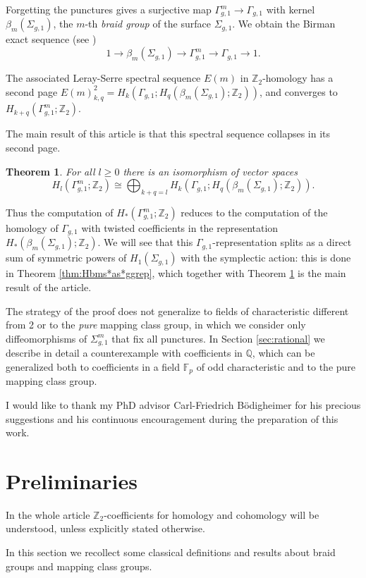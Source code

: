 \documentclass{amsart}
\theoremstyle{plain}
\newtheorem{thm}{Theorem}[section]
\theoremstyle{definition}
\newcommand{\F}{\mathbb{F}}
\newcommand{\Q}{\mathbb{Q}}
\newcommand{\Z}{\mathbb{Z}}
\newcommand{\sgm}{\Sigma_{g,1}^m}
\newcommand{\sg}{\Sigma_{g,1}}
\renewcommand{\gg}{\Gamma_{g,1}}
\newcommand{\ggm}{\gg^m}
\newcommand{\bms}{\beta_{m}(\sg)}
\newcommand{\pa}[1]{\left(#1\right)}
\begin{document}
Forgetting the punctures gives a surjective map $\ggm\to\gg$ with kernel $\bms$,
the $m$-th \emph{braid group} of the surface $\sg$. We obtain the Birman exact sequence (see \cite{Birman:mcgbr})
\begin{equation}
\label{eq:Birman}
1\to\bms\to\ggm\to\gg\to 1.
\end{equation}

The associated Leray-Serre spectral sequence $E(m)$ in $\Z_2$-homology has a second page $E(m)^2_{k,q}=H_k(\gg;H_q(\bms;\Z_2))$,
and converges to $H_{k+q}(\ggm;\Z_2)$.

The main result of this article is that this spectral sequence collapses in its second page.
\begin{thm}
\label{thm:main}
For all $l\geq 0$ there is an isomorphism of vector spaces
\begin{equation}
\label{eq:main}
H_l\pa{\ggm;\Z_2}\cong \bigoplus_{k+q=l} H_k\pa{\gg;H_q\pa{\bms;\Z_2}}.
\end{equation}
\end{thm}
Thus the computation of $H_*\pa{\ggm;\Z_2}$ reduces to the computation of the homology of $\gg$ with
twisted coefficients in the representation $H_*\pa{\bms;\Z_2}$. We will see that this $\gg$-representation
splits as a direct sum of symmetric powers of $H_1(\sg)$ with the symplectic action: this is done in
Theorem \ref{thm:Hbms*as*ggrep}, which together with Theorem \ref{thm:main} is the main result of the article.

The strategy of the proof does not generalize to fields of characteristic different from 2 or to the \emph{pure}
mapping class group, in which we consider only diffeomorphisms of $\sgm$ that fix all punctures. In Section \ref{sec:rational}
we describe in detail a counterexample with coefficients in $\Q$, which can be generalized both to coefficients
in a field $\F_p$ of odd characteristic and to the pure mapping class group.

I would like to thank my PhD advisor Carl-Friedrich B\"odigheimer for his precious suggestions and his continuous encouragement
during the preparation of this work.

\section{Preliminaries}
\label{sec:Preliminaries}
In the whole article $\Z_2$-coefficients for homology and cohomology will be understood,
unless explicitly stated otherwise.

In this section we recollect some classical definitions and results about braid groups and mapping class groups.
\end{document}
